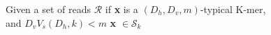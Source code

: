 \documentclass[preview]{standalone}
\begin{document}
\begin{center}
Given a set of reads $\mathcal{R}$ if \textbf{x} is a $(D_h,D_v,m)$-typical K-mer, \\
            and $D_v V_s(D_h,k) < m$  \textbf{x} $\in \mathcal{S}_k $
\end{center}
\end{document}
